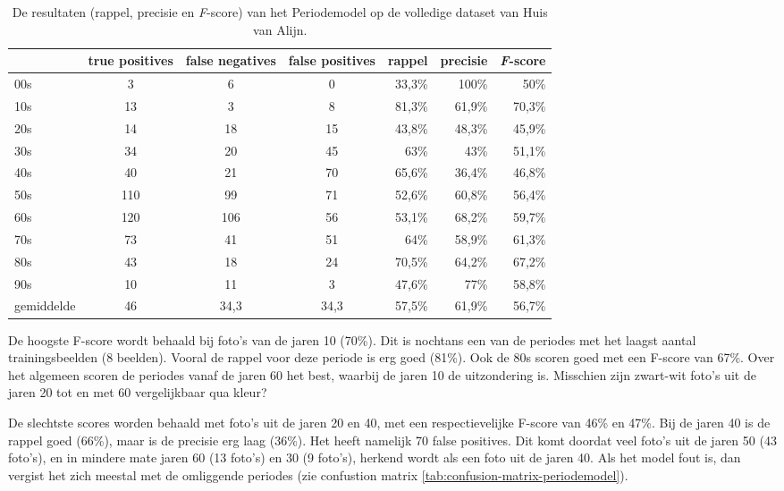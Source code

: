 \begin{table}
	\centering
    \renewcommand\arraystretch{1.2}
    \begin{tabular}{l|ccc|rrr}
        \toprule
        & true positives  & false negatives & false positives & rappel & precisie & \textit{F}-score \\ 
        \midrule
        00s & 3 & 6 & 0 & 33,3\% & 100\% & 50\% \\ 
        10s & 13 & 3 & 8 &  81,3\% & 61,9\% & 70,3\% \\ 
        20s & 14 & 18 & 15 & 43,8\% & 48,3\% & 45,9\% \\ 
        30s & 34 & 20 & 45  & 63\% & 43\% & 51,1\% \\ 
        40s & 40 & 21 & 70  & 65,6\% & 36,4\% & 46,8\% \\ 
        50s & 110 & 99 & 71  & 52,6\% & 60,8\% & 56,4\% \\ 
        60s & 120 & 106 & 56  & 53,1\% & 68,2\% & 59,7\% \\ 
        70s & 73 & 41 & 51  & 64\% & 58,9\% & 61,3\% \\ 
        80s & 43 & 18 & 24  & 70,5\% & 64,2\% & 67,2\% \\ 
        90s & 10 & 11 & 3  & 47,6\% & 77\% & 58,8\% \\ 
        \midrule
        gemiddelde & 46 & 34,3 & 34,3  & 57,5\% & 61,9\% & 56,7\% \\ 
        \bottomrule
    \end{tabular} 
    \caption{De resultaten (rappel, precisie en \textit{F}-score) van het Periodemodel op de volledige dataset van Huis van Alijn.}
    \label{tab:resultaten-periodemodel}
\end{table}

De hoogste F-score wordt behaald bij foto’s van de jaren 10 (70\%). Dit is nochtans een van de periodes met het laagst aantal trainingsbeelden (8 beelden). Vooral de rappel voor deze periode is erg goed (81\%). Ook de 80s scoren goed met een F-score van 67\%. Over het algemeen scoren de periodes vanaf de jaren 60 het best, waarbij de jaren 10 de uitzondering is. Misschien zijn zwart-wit foto’s uit de jaren 20 tot en met 60 vergelijkbaar qua kleur?

De slechtste scores worden behaald met foto’s uit de jaren 20 en 40, met een respectievelijke F-score van 46\% en 47\%. Bij de jaren 40 is de rappel goed (66\%), maar is de precisie erg laag (36\%). Het heeft namelijk 70 false positives. Dit komt doordat veel foto’s uit de jaren 50 (43 foto’s), en in mindere mate jaren 60 (13 foto’s) en 30 (9 foto’s), herkend wordt als een foto uit de jaren 40. Als het model fout is, dan vergist het zich meestal met de omliggende periodes (zie confustion matrix \ref{tab:confusion-matrix-periodemodel}).

